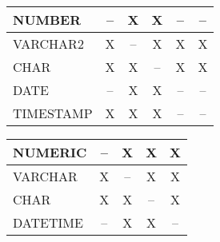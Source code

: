         \begin{center}
          \label{oracleimplicit}
          \begin{small}
            \tabletail{
              \hline
            }
            \tablelasttail{
              \hline
            }
            \begin{supertabular}{|l|c|c|c|c|c|}
              NUMBER    & -- & X  & X  & -- & -- \\
              \hline
              VARCHAR2  & X  & -- & X  & X  & X \\
              \hline
              CHAR      & X  & X  & -- & X  & X \\
              \hline
              DATE      & -- & X  & X  & -- & -- \\
              \hline
              TIMESTAMP & X  & X  & X  & -- & -- \\
            \end{supertabular}
          \end{small}
        \end{center}
\clearpage
        \begin{center}
          \label{mssqlimplicit}
          \begin{small}
            \tabletail{
              \hline
            }
            \tablelasttail{
              \hline
            }
            \begin{supertabular}{|l|c|c|c|c|}
              NUMERIC   & -- & X  & X  & X \\
              \hline
              VARCHAR   & X  & -- & X  & X \\
              \hline
              CHAR      & X  & X  & -- & X \\
              \hline
              DATETIME  & -- & X  & X  & -- \\
            \end{supertabular}
          \end{small}
        \end{center}
